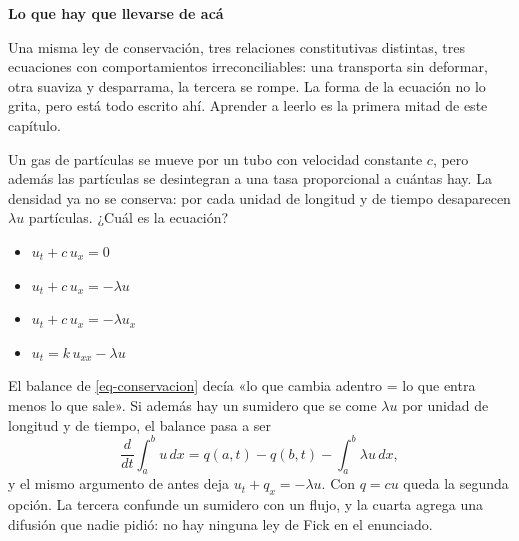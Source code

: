 \documentclass[
  spanish,
  a4paper,
]{scrbook}
\providecommand{\tightlist}{%
  \setlength{\itemsep}{0pt}\setlength{\parskip}{0pt}}
\theoremstyle{definition}
\theoremstyle{plain}
\theoremstyle{definition}
\theoremstyle{plain}
\theoremstyle{definition}
\theoremstyle{remark}
\begin{document}
\begin{tcolorbox}[enhanced jigsaw, arc=.35mm, bottomrule=.15mm, breakable, colback=white, colframe=quarto-callout-tip-color-frame, left=2mm, leftrule=.75mm, opacityback=0, rightrule=.15mm, toprule=.15mm]
\begin{minipage}[t]{5.5mm}
\textcolor{quarto-callout-tip-color}{\faLightbulb}
\end{minipage}%
\begin{minipage}[t]{\textwidth - 5.5mm}

\vspace{-3mm}\textbf{Lo que hay que llevarse de acá}\vspace{3mm}

Una misma ley de conservación, tres relaciones constitutivas distintas,
tres ecuaciones con comportamientos irreconciliables: una transporta sin
deformar, otra suaviza y desparrama, la tercera se rompe. La forma de la
ecuación no lo grita, pero está todo escrito ahí. Aprender a leerlo es
la primera mitad de este capítulo.

\end{minipage}%
\end{tcolorbox}

Un gas de partículas se mueve por un tubo con velocidad constante \(c\),
pero además las partículas se desintegran a una tasa proporcional a
cuántas hay. La densidad ya no se conserva: por cada unidad de longitud
y de tiempo desaparecen \(\lambda u\) partículas. ¿Cuál es la ecuación?

\begin{itemize}
\tightlist
\item
  {\(u_t + c\,u_x = 0\)}
\item
  {\(u_t + c\,u_x = -\lambda u\)}
\item
  {\(u_t + c\,u_x = -\lambda u_x\)}
\item
  {\(u_t = k\,u_{xx} - \lambda u\)}
\end{itemize}

El balance de \ref{eq-conservacion} decía «lo que cambia adentro = lo
que entra menos lo que sale». Si además hay un sumidero que se come
\(\lambda u\) por unidad de longitud y de tiempo, el balance pasa a ser
\[\frac{d}{dt}\int_a^b u\,dx = q(a,t) - q(b,t) - \int_a^b \lambda u\,dx,\]
y el mismo argumento de antes deja \(u_t + q_x = -\lambda u\). Con
\(q = cu\) queda la segunda opción. La tercera confunde un sumidero con
un flujo, y la cuarta agrega una difusión que nadie pidió: no hay
ninguna ley de Fick en el enunciado.
\end{document}

